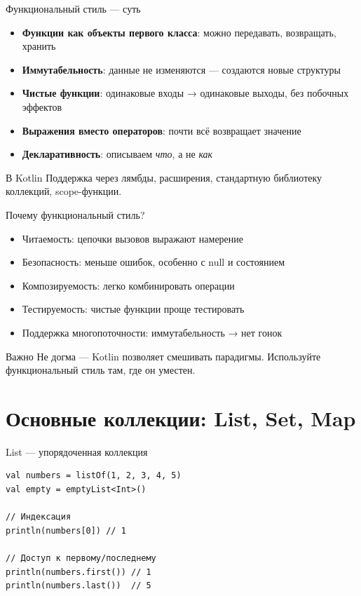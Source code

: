 \documentclass[aspectratio=169]{beamer}
\begin{document}
\begin{frame}{Функциональный стиль — суть}
  \begin{itemize}
    \item \textbf{Функции как объекты первого класса}: можно передавать, возвращать, хранить
    \item \textbf{Иммутабельность}: данные не изменяются — создаются новые структуры
    \item \textbf{Чистые функции}: одинаковые входы → одинаковые выходы, без побочных эффектов
    \item \textbf{Выражения вместо операторов}: почти всё возвращает значение
    \item \textbf{Декларативность}: описываем \textit{что}, а не \textit{как}
  \end{itemize}
  \begin{block}{В Kotlin}
    Поддержка через лямбды, расширения, стандартную библиотеку коллекций, scope-функции.
  \end{block}
\end{frame}

\begin{frame}{Почему функциональный стиль?}
  \begin{itemize}
    \item Читаемость: цепочки вызовов выражают намерение
    \item Безопасность: меньше ошибок, особенно с null и состоянием
    \item Композируемость: легко комбинировать операции
    \item Тестируемость: чистые функции проще тестировать
    \item Поддержка многопоточности: иммутабельность → нет гонок
  \end{itemize}
  \begin{block}{Важно}
    Не догма — Kotlin позволяет смешивать парадигмы. Используйте функциональный стиль там, где он уместен.
  \end{block}
\end{frame}

\section{Основные коллекции: List, Set, Map}

\begin{frame}[fragile]{List — упорядоченная коллекция}
\lstset{language=Kotlin}
\begin{lstlisting}
val numbers = listOf(1, 2, 3, 4, 5)
val empty = emptyList<Int>()

// Индексация
println(numbers[0]) // 1

// Доступ к первому/последнему
println(numbers.first()) // 1
println(numbers.last())  // 5
\end{lstlisting}
\end{frame}
\end{document}
